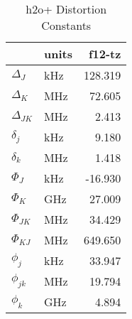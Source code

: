 \begin{table}
\centering
\caption{h2o+ Distortion Constants}
\label{h2o+_dis}
\begin{tabular}{llr}
\toprule
 & units & f12-tz \\
\midrule
$\Delta_J$ & kHz & 128.319 \\
$\Delta_K$ & MHz & 72.605 \\
$\Delta_{JK}$ & MHz & 2.413 \\
$\delta_j$ & kHz & 9.180 \\
$\delta_k$ & MHz & 1.418 \\
$\Phi_J$ & kHz & -16.930 \\
$\Phi_K$ & GHz & 27.009 \\
$\Phi_{JK}$ & MHz & 34.429 \\
$\Phi_{KJ}$ & MHz & 649.650 \\
$\phi_j$ & kHz & 33.947 \\
$\phi_{jk}$ & MHz & 19.794 \\
$\phi_k$ & GHz & 4.894 \\
\bottomrule
\end{tabular}
\end{table}
